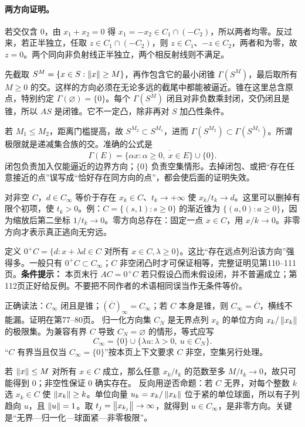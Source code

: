 \paragraph{两方向证明。} 若交仅含 $0$，由 $x_1+x_2=0$ 得 $x_1=-x_2\in C_1\cap(-C_2)$，所以两者均零。反过来，若正半独立，任取 $z\in C_1\cap(-C_2)$，则 $z\in C_1$、$-z\in C_2$，两者和为零，故 $z=0$。两个同向非负射线正半独立，两个相反射线则不满足。

先截取 $S^M=\{x\in S:\left\lVert x\right\rVert\ge M\}$，再作包含它的最小闭锥 $\Gamma(S^M)$，最后取所有 $M\ge0$ 的交。这样的方向必须在无论多远的截尾中都能被逼近。锥在这里总含原点，特别约定 $\Gamma(\varnothing)=\{0\}$。每个 $\Gamma(S^M)$ 闭且对非负数乘封闭，交仍闭且是锥，所以 $AS$ 是闭锥。它不一定凸，除非再对 $S$ 加凸性条件。

若 $M_1\le M_2$，距离门槛提高，故 $S^{M_2}\subset S^{M_1}$，进而 $\Gamma(S^{M_2})\subset\Gamma(S^{M_1})$。所谓极限就是递减集合族的交。准确的公式是
\[\Gamma(E)=\overline{\{\alpha x:\alpha\ge0,\ x\in E\}\cup\{0\}}.\]
闭包负责加入仅能逼近的边界方向；$\{0\}$ 负责空集情形。去掉闭包、或把“存在任意接近的点”误写成“恰好存在同方向的点”，都会使后面的证明失效。

对非空 $C$，$d\in C_\infty$ 等价于存在 $x_k\in C$、$t_k\to+\infty$ 使 $x_k/t_k\to d$。这里可以删掉有限个初项，使 $t_k>0$。例：$C=\{(s,1):s\ge0\}$ 的渐近锥为 $\{(a,0):a\ge0\}$，因为缩放后第二坐标 $1/t_k\to0$。零方向总存在：固定一点 $x\in C$，用 $x/k\to0$。非零方向才表示真正逃向无穷远。

定义 $0^+C=\{d:x+\lambda d\in C\text{ 对所有 }x\in C,\lambda\ge0\}$。这比“存在远点列沿该方向”强得多。一般只有 $0^+C\subset C_\infty$；$C$ 非空闭凸时才可保证相等，完整证明见第110--111页。\textbf{条件提示：} 本页末行 $AC=0^+C$ 若只假设凸而未假设闭，并不普遍成立；第112页正好给反例。不要把不同作者的术语相同误当作无条件等价。

正确读法：$C_\infty$ 闭且是锥；$(\overline C)_\infty=C_\infty$；若 $C$ 本身是锥，则 $C_\infty=\overline C$，横线不能漏。证明在第77--80页。
归一化方向集 $C_N$ 是无界点列 $x_k$ 的单位方向 $x_k/\left\lVert x_k\right\rVert$ 的极限集。为兼容有界 $C$ 导致 $C_N=\varnothing$ 的情形，等式应写
\[C_\infty=\{0\}\cup\{\lambda u:\lambda>0,\ u\in C_N\}.\]
“$C$ 有界当且仅当 $C_\infty=\{0\}$”按本页上下文要求 $C$ 非空，空集另行处理。

若 $\left\lVert x\right\rVert\le M$ 对所有 $x\in C$ 成立，那么任意 $x_k/t_k$ 的范数至多 $M/t_k\to0$，故只可能得到 $0$；非空性保证 $0$ 确实存在。
反向用逆否命题：若 $C$ 无界，对每个整数 $k$ 选 $x_k\in C$ 使 $\left\lVert x_k\right\rVert\ge k$。单位向量 $u_k=x_k/\left\lVert x_k\right\rVert$ 位于紧的单位球面，所以有子列趋向 $u$，且 $\left\lVert u\right\rVert=1$。取 $t_j=\left\lVert x_{k_j}\right\rVert\to\infty$，就得到 $u\in C_\infty$，是非零方向。关键是“无界—归一化—球面紧—非零极限”。

